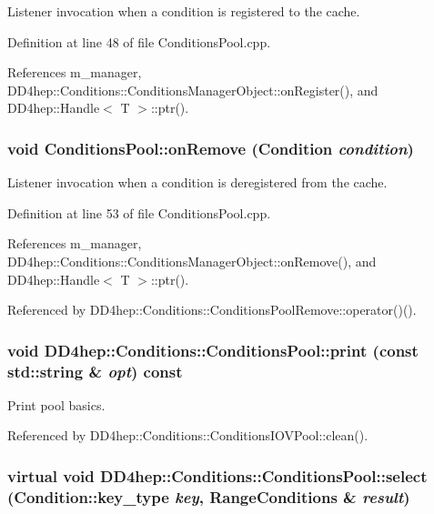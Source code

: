 Listener invocation when a condition is registered to the cache. 

Definition at line 48 of file ConditionsPool.cpp.

References m\_\-manager, DD4hep::Conditions::ConditionsManagerObject::onRegister(), and DD4hep::Handle$<$ T $>$::ptr().\hypertarget{class_d_d4hep_1_1_conditions_1_1_conditions_pool_aadcb09f91ee89996577258c1d9443c88}{
\subsubsection[{onRemove}]{\setlength{\rightskip}{0pt plus 5cm}void ConditionsPool::onRemove ({\bf Condition} {\em condition})}}
\label{class_d_d4hep_1_1_conditions_1_1_conditions_pool_aadcb09f91ee89996577258c1d9443c88}


Listener invocation when a condition is deregistered from the cache. 

Definition at line 53 of file ConditionsPool.cpp.

References m\_\-manager, DD4hep::Conditions::ConditionsManagerObject::onRemove(), and DD4hep::Handle$<$ T $>$::ptr().

Referenced by DD4hep::Conditions::ConditionsPoolRemove::operator()().\hypertarget{class_d_d4hep_1_1_conditions_1_1_conditions_pool_ab1af771f53b52f857ce4e127ad18ee32}{
\subsubsection[{print}]{\setlength{\rightskip}{0pt plus 5cm}void DD4hep::Conditions::ConditionsPool::print (const std::string \& {\em opt}) const}}
\label{class_d_d4hep_1_1_conditions_1_1_conditions_pool_ab1af771f53b52f857ce4e127ad18ee32}


Print pool basics. 

Referenced by DD4hep::Conditions::ConditionsIOVPool::clean().\hypertarget{class_d_d4hep_1_1_conditions_1_1_conditions_pool_a742ca5a35a44037e523a7e654924c5eb}{
\subsubsection[{select}]{\setlength{\rightskip}{0pt plus 5cm}virtual void DD4hep::Conditions::ConditionsPool::select ({\bf Condition::key\_\-type} {\em key}, \/  {\bf RangeConditions} \& {\em result})}}
\label{class_d_d4hep_1_1_conditions_1_1_conditions_pool_a742ca5a35a44037e523a7e654924c5eb}


